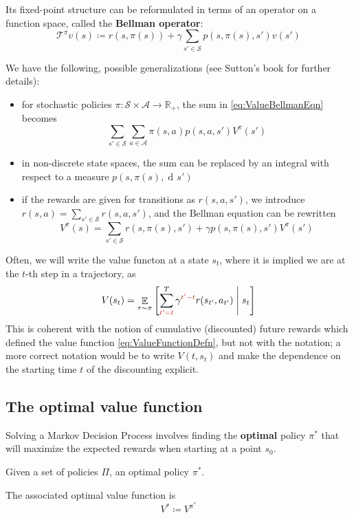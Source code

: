 \documentclass[12pt]{report}
\newcommand\RR{\mathbb{R}}
\newcommand{\scalemid}{\;\middle|\;}
\DeclareMathOperator{\EE}{\mathbb{E}}
\newcommand{\der}{\operatorname{d\!}{}}
\newcommand{\calA}{\mathcal{A}}
\newcommand{\calS}{\mathcal{S}}
\newcommand{\calT}{\mathcal{T}}
\newcommand{\redfont}{\color{darkred}}
\newcommand{\bluefont}{\color{Blue}}
\begin{document}
Its fixed-point structure can be reformulated in terms of an operator on a function space, called the \textbf{Bellman operator}:
\[
	\calT^\pi v(s) \coloneqq
	r(s,\pi(s)) + \gamma\sum_{s'\in\calS}p(s,\pi(s),s') v(s')
\]



\begin{remark}
We have the following, possible generalizations (see Sutton's book \cite[][chap.\ 3,4]{Sutton1998} for further details):
\begin{itemize}
	\item for stochastic policies $\pi\colon \calS\times\calA \to \RR_+$, the sum in \cref{eq:ValueBellmanEqn} becomes 
	\[
	\sum_{s'\in\calS} \sum_{a\in\calA} \pi(s,a) p(s,a,s')V^\pi(s')
	\]
	\item in non-discrete state spaces, the sum can be replaced by an integral with respect to a measure $p(s,\pi(s),\der s')$
	\item if the rewards are given for transitions as $r(s,a,s')$, we introduce $r(s,a) = \sum_{s'\in\calS}r(s,a,s')$, and the Bellman equation can be rewritten
	\[
		V^\pi(s) = \sum_{s'\in\calS}
		r(s,\pi(s),s') + \gamma p(s,\pi(s),s')V^\pi(s')
	\]
\end{itemize}
\end{remark}


\begin{remark}
	Often, we will write the value functon at a state $s_t$, where it is implied we are at the $t$-th step in a trajectory, as
	\[
		V(s_t) = \EE_{\tau\sim\pi}\left[
		\sum_{{\redfont t'=t}}^T \gamma^{{\redfont t'-t}} r(s_{t'}, a_{t'})
		\scalemid s_t
		\right]
	\]
	This is coherent with the notion of cumulative (discounted) future rewards which defined the value function \eqref{eq:ValueFunctionDefn}, but not with the notation; a more correct notation would be to write $V(t, s_t)$ and make the dependence on the starting time $t$ of the discounting explicit.
\end{remark}

\subsection{The optimal value function}

Solving a Markov Decision Process involves finding the \textbf{\bluefont optimal} policy $\pi^*$ that will maximize the expected rewards when starting at a point $s_0$.

\begin{defn}
	Given a set of policies $\Pi$, an optimal policy $\pi^*$.
	
	The associated optimal value function is
	\[
		V^* \coloneqq V^{\pi^*}
	\]
\end{defn}
\end{document}
